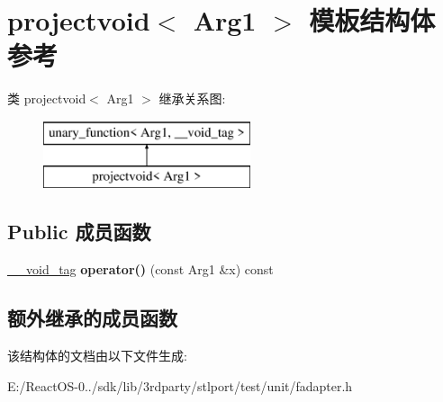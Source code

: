 \hypertarget{structprojectvoid}{}\section{projectvoid$<$ Arg1 $>$ 模板结构体 参考}
\label{structprojectvoid}
类 projectvoid$<$ Arg1 $>$ 继承关系图\+:\begin{figure}[H]
\begin{center}
\leavevmode
\includegraphics[height=2.000000cm]{structprojectvoid}
\end{center}
\end{figure}
\subsection*{Public 成员函数}
\begin{DoxyCompactItemize}
\item 
\mbox{\label{structprojectvoid_a89bb529ae1bacb86dc095358d8822407}} 
\hyperlink{struct____void__tag}{\+\_\+\+\_\+void\+\_\+tag} {\bfseries operator()} (const Arg1 \&x) const
\end{DoxyCompactItemize}
\subsection*{额外继承的成员函数}


该结构体的文档由以下文件生成\+:\begin{DoxyCompactItemize}
\item 
E\+:/\+React\+O\+S-\/0../sdk/lib/3rdparty/stlport/test/unit/fadapter.\+h\end{DoxyCompactItemize}
